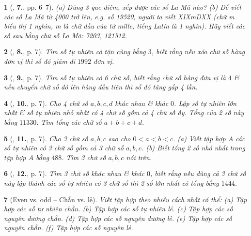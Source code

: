 \documentclass{article}
\newtheorem{baitoan}{}
\begin{document}
\begin{baitoan}[\cite{Binh_Toan_6_tap_1}, \textbf{7.}, pp. 6--7]
	(a) Dùng 3 que diêm, xếp được các số La Mã nào? (b) Để viết các số La Mã từ 4000 trở lên, e.g. số 19520, người ta viết XIXmDXX (chữ m biểu thị \emph{1 nghìn}, m là chữ đầu của từ \emph{mille}, tiếng Latin là 1 nghìn). Hãy viết các số sau bằng chữ số La Mã: 7203, 121512.
\end{baitoan}

\begin{baitoan}[\cite{Binh_Toan_6_tap_1}, \textbf{8.}, p. 7]
	Tìm số tự nhiên có tận cùng bằng $3$, biết rằng nếu xóa chữ số hàng đơn vị thì số đó giảm đi $1992$ đơn vị.
\end{baitoan}

\begin{baitoan}[\cite{Binh_Toan_6_tap_1}, \textbf{9.}, p. 7]
	Tìm số tự nhiên có 6 chữ số, biết rằng chữ số hàng đơn vị là $4$ \& nếu chuyển chữ số đó lên hàng đầu tiên thì số đó tăng gấp 4 lần.
\end{baitoan}

\begin{baitoan}[\cite{Binh_Toan_6_tap_1}, \textbf{10.}, p. 7]
	Cho 4 chữ số $a,b,c,d$ khác nhau \& khác $0$. Lập số tự nhiên lớn nhất \& số tự nhiên nhỏ nhất có 4 chữ số gồm cả 4 chữ số ấy. Tổng của 2 số này bằng $11330$. Tìm tổng các chữ số $a + b + c + d$.
\end{baitoan}

\begin{baitoan}[\cite{Binh_Toan_6_tap_1}, \textbf{11.}, p. 7]
	Cho 3 chữ số $a,b,c$ sao cho $0 < a < b < c$. (a) Viết tập hợp $A$ các số tự nhiên có 3 chữ số gồm cả 3 chữ số $a,b,c$. (b) Biết tổng 2 số nhỏ nhất trong tập hợp $A$ bằng $488$. Tìm 3 chữ số $a,b,c$ nói trên.
\end{baitoan}

\begin{baitoan}[\cite{Binh_Toan_6_tap_1}, \textbf{12.}, p. 7]
	Tìm 3 chữ số khác nhau \& khác $0$, biết rằng nếu dùng cả 3 chữ số này lập thành các số tự nhiên có 3 chữ số thì 2 số lớn nhất có tổng bằng $1444$.
\end{baitoan}

\begin{baitoan}[Even vs. odd -- Chẵn vs. lẻ]
	Viết tập hợp theo nhiều cách nhất có thể: (a) Tập hợp các số tự nhiên chẵn. (b) Tập hợp các số tự nhiên lẻ. (c) Tập hợp các số nguyên dương chẵn. (d) Tập hợp các số nguyên dương lẻ. (e) Tập hợp các số nguyên chẵn. (f) Tập hợp các số nguyên lẻ.
\end{baitoan}
\end{document}
